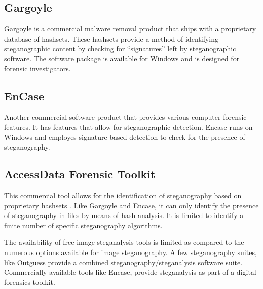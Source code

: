 \subsection{Gargoyle} Gargoyle \cite{gargoyle} is a commercial malware removal product that ships with a proprietary database of hashsets. These hashsets provide a method of identifying steganographic content by checking for ``signatures'' left by steganographic software. The software package is available for Windows and is designed for forensic investigators.
\subsection{EnCase}Another commercial software product \cite{encase} that provides various  computer forensic features. It has features that allow for steganographic detection. Encase runs on Windows and employes signature based detection to check for the presence of steganography.
\subsection{AccessData Forensic Toolkit} This commercial tool allows for the identification of steganography based on proprietary hashsets \cite{ftk}. Like Gargoyle and Encase, it can only identify the presence of steganography in files by means of hash analysis. It is limited to identify a finite number of specific steganography algorithms. 
 
The availability of free image steganalysis tools is limited as compared to the numerous options available for image steganography. A few steganography suites, like Outguess \cite{outguess} provide a combined steganography/steganalysis software suite. Commercially available tools like Encase, provide steganalysis as part of a digital forensics toolkit.  

